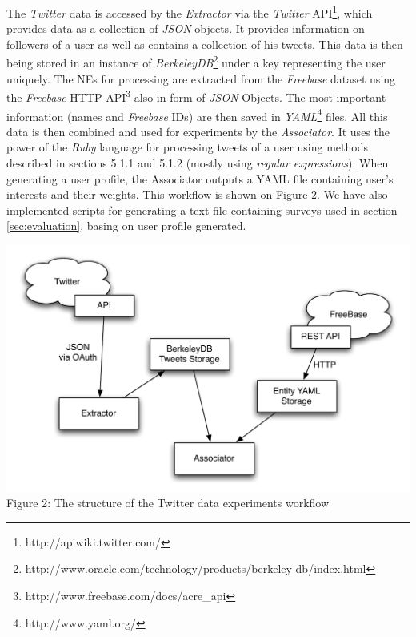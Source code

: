 The \textit{Twitter} data is accessed by the \textit{Extractor} via the \textit{Twitter}
API\footnote{http://apiwiki.twitter.com/}, which provides data as a collection of \textit{JSON} objects. It provides
information on followers of a user as well as contains a collection of his tweets. This data is then being
stored in an instance of \textit{BerkeleyDB}\footnote{http://www.oracle.com/technology/products/berkeley-db/index.html}
under a key representing the user uniquely. The NEs for processing are extracted from the \textit{Freebase}
dataset using the \textit{Freebase} HTTP API\footnote{http://www.freebase.com/docs/acre\_api} also in
form of \textit{JSON} Objects. The most important information (names and \textit{Freebase} IDs) are then
saved in \textit{YAML}\footnote{http://www.yaml.org/} files. All this data is then combined and used
for experiments by the \textit{Associator}. It uses the power of the \textit{Ruby} language for processing tweets
of a user using methods described in sections 5.1.1 and 5.1.2 (mostly using \textit{regular expressions}).
When generating a user profile, the Associator outputs a YAML file containing user's interests and
their weights.  This workflow is shown on Figure 2. We have also implemented scripts for generating a text file
containing surveys used in section \ref{sec:evaluation}, basing on user profile generated.

\begin{center}
  \includegraphics[scale=0.65]{images/twitter_diagram.pdf} \\
  Figure 2: The structure of the Twitter data experiments workflow
\end{center}

